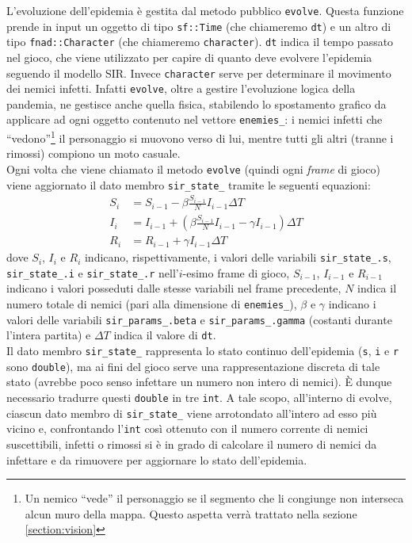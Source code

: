 \documentclass{article}
\newcommand{\quotes}[1]{``#1''}
\begin{document}
L'evoluzione dell'epidemia è gestita dal metodo pubblico \verb|evolve|. Questa funzione prende in input un oggetto di tipo \verb|sf::Time| (che chiameremo \verb|dt|) e un altro di tipo \verb|fnad::Character| (che chiameremo \verb|character|). \verb|dt| indica il tempo passato nel gioco, che viene utilizzato per capire di quanto deve evolvere l'epidemia seguendo il modello SIR. Invece \verb|character| serve per determinare il movimento dei nemici infetti. Infatti \verb|evolve|, oltre a gestire l'evoluzione logica della pandemia, ne gestisce anche quella fisica, stabilendo lo spostamento grafico da applicare ad ogni oggetto contenuto nel vettore \verb|enemies_|: i nemici infetti che \quotes{vedono}\footnote{Un nemico \quotes{vede} il personaggio se il segmento che li congiunge non interseca alcun muro della mappa. Questo aspetta verrà trattato nella sezione \ref{section:vision}} il personaggio si muovono verso di lui, mentre tutti gli altri (tranne i rimossi) compiono un moto casuale.\\
Ogni volta che viene chiamato il metodo \verb|evolve| (quindi ogni \textit{frame} di gioco) viene aggiornato il dato membro \verb|sir_state_| tramite le seguenti equazioni:
\begin{align*}
    S_i &= S_{i-1} - \beta \frac{S_{i-1}}{N} I_{i-1} \Delta T\\
    I_i &= I_{i-1} + \left( \beta \frac{S_{i-1}}{N} I_{i-1} - \gamma I_{i-1} \right) \Delta T\\
    R_i &= R_{i-1} + \gamma I_{i-1} \Delta T
\end{align*}
dove $S_i$, $I_i$ e $R_i$ indicano, rispettivamente, i valori delle variabili \verb|sir_state_.s|, \verb|sir_state_.i| e \verb|sir_state_.r| nell'$i$-esimo frame di gioco, $S_{i - 1}$, $I_{i - 1}$ e $R_{i - 1}$ indicano i valori posseduti dalle stesse variabili nel frame precedente, $N$ indica il numero totale di nemici (pari alla dimensione di \verb|enemies_|), $\beta$ e $\gamma$ indicano i valori delle variabili \verb|sir_params_.beta| e \verb|sir_params_.gamma| (costanti durante l'intera partita) e $\Delta T$ indica il valore di \verb|dt|.\\
Il dato membro \verb|sir_state_| rappresenta lo stato continuo dell'epidemia (\verb|s|, \verb|i| e \verb|r| sono \verb|double|), ma ai fini del gioco serve una rappresentazione discreta di tale stato (avrebbe poco senso infettare un numero non intero di nemici). È dunque necessario tradurre questi \verb|double| in tre \verb|int|. A tale scopo, all'interno di evolve, ciascun dato membro di \verb|sir_state_| viene arrotondato all'intero ad esso più vicino e, confrontando l'\verb|int| così ottenuto con il numero corrente di nemici suscettibili, infetti o rimossi si è in grado di calcolare il numero di nemici da infettare e da rimuovere per aggiornare lo stato dell'epidemia.
\end{document}
